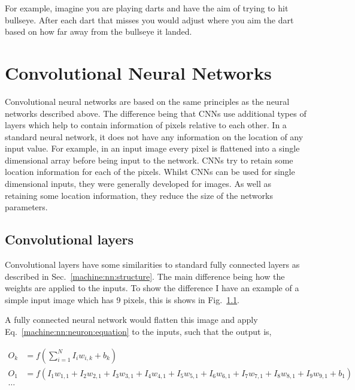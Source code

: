 For example, imagine you are playing darts and have the aim of trying to hit bullseye.
After each dart that misses you would adjust where you aim the dart based on how far away from the bullseye it landed.

\section{Convolutional Neural Networks}

Convolutional neural networks are based on the same principles as the neural networks described above. 
The difference being that \acp{CNN} use additional types of layers which help to contain information of pixels relative to each other.
In a standard neural network, it does not have any information on the location of any input value.
For example, in an input image every pixel is flattened into a single dimensional array before being input to the network.
\acp{CNN} try to retain some location information for each of the pixels.
Whilst \acp{CNN} can be used for single dimensional inputs, they were generally developed for images.
As well as retaining some location information, they reduce the size of the networks parameters.


\subsection{Convolutional layers}

Convolutional layers have some similarities to standard fully connected layers as described in Sec.~\ref{machine:nn:structure}. 
The main difference being how the weights are applied to the inputs.
To show the difference I have an example of a simple input image which has 9 pixels, this is shows in Fig.~\ref{}.

A fully connected neural network would flatten this image and apply Eq.~\ref{machine:nn:neuron:equation} to the inputs, such that the output is,

\begin{equation}
\begin{split}
    O_{k} &= f\left(\sum^N_{i=1} I_i w_{i,k} + b_k \right) \\
    O_1 &= f\left(I_1 w_{1,1} + I_2 w_{2,1} + I_3 w_{3,1} + I_4 w_{4,1} + I_5 w_{5,1} + I_6 w_{6,1} + I_7 w_{7,1} + I_8 w_{8,1} + I_9 w_{9,1} + b_1\right) \\
     \dots
\end{split}
\end{equation}

